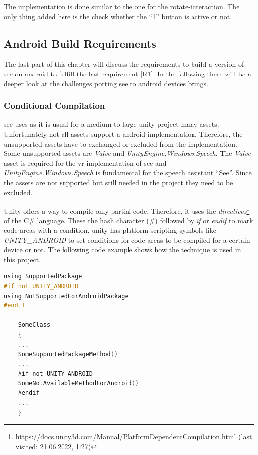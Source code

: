The implementation is done similar to the one for the rotate-interaction. 
The only thing added here is the check whether the \enquote{1} button is active or not.

\subsection{Android Build Requirements}
The last part of this chapter will discuss the requirements to build a version of \gls{see} on \gls{android} to fulfill the last requirement [R1].
In the following there will be a deeper look at the challenges porting \gls{see} to android devices brings. 


\subsubsection{Conditional Compilation}

\gls{see} uses as it is usual for a medium to large \gls{unity} project many \glspl{asset}.
Unfortunately not all \glspl{asset} support a \gls{android} implementation.
Therefore, the unsupported assets have to exchanged or excluded from the implementation.
Some unsupported \glspl{asset} are \textit{Valve} and \textit{UnityEngine.Windows.Speech}.
The \textit{Valve} \gls{asset} is required for the \gls{vr} implementation of \gls{see} and \textit{UnityEngine.Windows.Speech} is fundamental for the speech assistant \enquote{See}.
Since the \glspl{asset} are not supported but still needed in the project they need to be excluded. 

Unity offers a way to compile only partial code. 
Therefore, it uses the \textit{directives}\footnote{https://docs.unity3d.com/Manual/PlatformDependentCompilation.html (last visited: 21.06.2022, 1:27)} of the C\# language. 
These the hash character (\#) followed by \textit{if} or \textit{endif} to mark code areas with a condition.
\gls{unity} has platform scripting symbols like \textit{UNITY\_ANDROID} to set conditions for code areas to be compiled for a certain device or not.
The following code example shows how the technique is used in this project. 

\begin{minipage}{\linewidth}

\begin{lstlisting}[language=C]
using SupportedPackage
#if not UNITY_ANDROID
using NotSupportedForAndroidPackage
#endif 

    SomeClass
    {
    ...
    SomeSupportedPackageMethod()
    ...
    #if not UNITY_ANDROID
    SomeNotAvailableMethodForAndroid()
    #endif
    ...
    }
\end{lstlisting}

\end{minipage}

